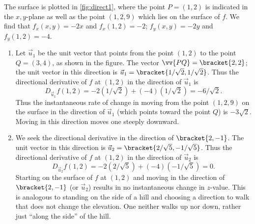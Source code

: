 {
The surface is plotted in \autoref{fig:direct1}, where the point $P=(1,2)$ is indicated in the $x,y$-plane as well as the point $(1,2,9)$ which lies on the surface of $f$. We find that $f_x(x,y) = -2x$ and $f_x(1,2) = -2$; $f_y(x,y) = -2y$ and $f_y(1,2) = -4$. 
\begin{enumerate}
	\item Let $\vec u_1$ be the unit vector that points from the point $(1,2)$ to the point $Q=(3,4)$, as shown in the figure. The vector $\vv{PQ} =\bracket{2,2}$; the unit vector in this direction is $\vec u_1=\bracket{1/\sqrt{2}, 1/\sqrt{2}}$. Thus the directional derivative of $f$ at $(1,2)$ in the direction of $\vec u_1$ is
	$$D_{\vec u_1}f(1,2) = -2(1/\sqrt{2}) +(-4)(1/\sqrt{2}) = -6/\sqrt{2}%
	.$$
	Thus the instantaneous rate of change in moving from the point $(1,2,9)$ on the surface in the direction of $\vec u_1$ (which points toward the point $Q$) is $-3\sqrt2$. Moving in this direction moves one steeply downward.
	
	\item		We seek the directional derivative in the direction of $\bracket{2,-1}$. The unit vector in this direction is $\vec u_2 =\bracket{2/\sqrt{5},-1/\sqrt{5}}$. Thus the directional derivative of $f$ at $(1,2)$ in the direction of $\vec u_2$ is
	$$D_{\vec u_2}f(1,2) = -2(2/\sqrt{5})+(-4)(-1/\sqrt{5}) = 0.$$
	Starting on the surface of $f$ at $(1,2)$ and moving in the direction of $\bracket{2,-1}$ (or $\vec u_2$) results in no instantaneous change in $z$-value. This is analogous to standing on the side of a hill and choosing a direction to walk that does not change the elevation. One neither walks up nor down, rather just ``along the side'' of the hill.
	

\end{enumerate}}
